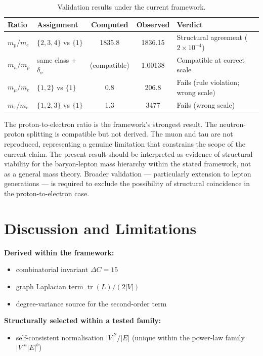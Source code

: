 \documentclass[12pt]{article}
\begin{document}
\begin{table}[ht]
\centering
\caption{Validation results under the current framework.}
\label{tab:validation}
\begin{tabular}{@{}llccl@{}}
\toprule
Ratio & Assignment & Computed & Observed & Verdict \\
\midrule
$m_p/m_e$ & $\{2,3,4\}$ vs $\{1\}$ & 1835.8 & 1836.15 & Structural agreement ($2 \times 10^{-4}$) \\
$m_n/m_p$ & same class + $\delta_\sigma$ & (compatible) & 1.00138 & Compatible at correct scale \\
$m_\mu/m_e$ & $\{1,2\}$ vs $\{1\}$ & 0.8 & 206.8 & Fails (rule violation; wrong scale) \\
$m_\tau/m_e$ & $\{1,2,3\}$ vs $\{1\}$ & 1.3 & 3477 & Fails (wrong scale) \\
\bottomrule
\end{tabular}
\end{table}

The proton-to-electron ratio is the framework's strongest result. The neutron-proton splitting is compatible but not derived. The muon and tau are not reproduced, representing a genuine limitation that constrains the scope of the current claim. The present result should be interpreted as evidence of structural viability for the baryon-lepton mass hierarchy within the stated framework, not as a general mass theory. Broader validation --- particularly extension to lepton generations --- is required to exclude the possibility of structural coincidence in the proton-to-electron case.

\section{Discussion and Limitations}\label{sec:discussion}

\textbf{Derived within the framework:}
\begin{itemize}
    \item combinatorial invariant $\Delta C = 15$
    \item graph Laplacian term $\operatorname{tr}(L)/(2|V|)$
    \item degree-variance source for the second-order term
\end{itemize}

\textbf{Structurally selected within a tested family:}
\begin{itemize}
    \item self-consistent normalisation $|V|^2/|E|$ (unique within the power-law family $|V|^a |E|^b$)
\end{itemize}
\end{document}

